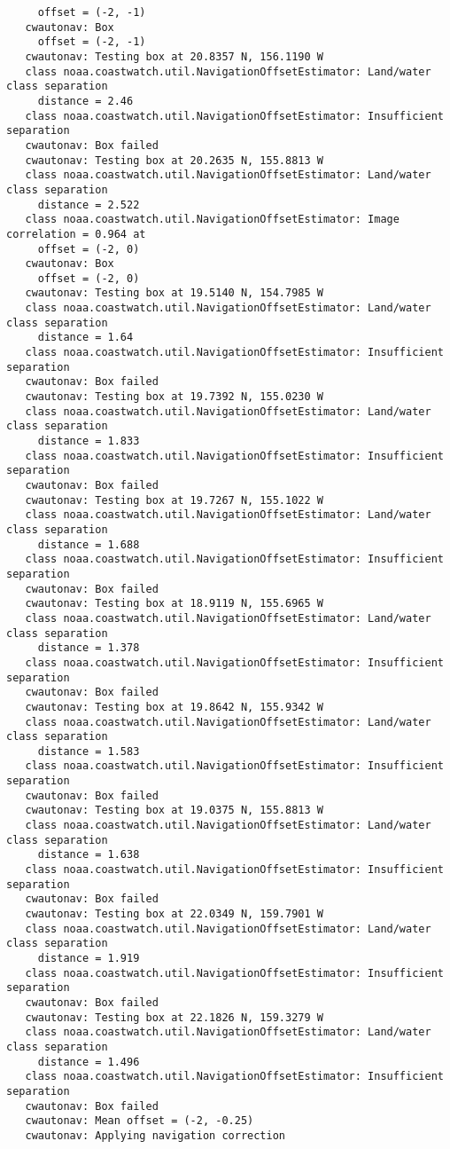 \begin{verbatim}
     offset = (-2, -1)
   cwautonav: Box 
     offset = (-2, -1)
   cwautonav: Testing box at 20.8357 N, 156.1190 W
   class noaa.coastwatch.util.NavigationOffsetEstimator: Land/water class separation 
     distance = 2.46
   class noaa.coastwatch.util.NavigationOffsetEstimator: Insufficient separation
   cwautonav: Box failed
   cwautonav: Testing box at 20.2635 N, 155.8813 W
   class noaa.coastwatch.util.NavigationOffsetEstimator: Land/water class separation 
     distance = 2.522
   class noaa.coastwatch.util.NavigationOffsetEstimator: Image correlation = 0.964 at 
     offset = (-2, 0)
   cwautonav: Box 
     offset = (-2, 0)
   cwautonav: Testing box at 19.5140 N, 154.7985 W
   class noaa.coastwatch.util.NavigationOffsetEstimator: Land/water class separation 
     distance = 1.64
   class noaa.coastwatch.util.NavigationOffsetEstimator: Insufficient separation
   cwautonav: Box failed
   cwautonav: Testing box at 19.7392 N, 155.0230 W
   class noaa.coastwatch.util.NavigationOffsetEstimator: Land/water class separation 
     distance = 1.833
   class noaa.coastwatch.util.NavigationOffsetEstimator: Insufficient separation
   cwautonav: Box failed
   cwautonav: Testing box at 19.7267 N, 155.1022 W
   class noaa.coastwatch.util.NavigationOffsetEstimator: Land/water class separation 
     distance = 1.688
   class noaa.coastwatch.util.NavigationOffsetEstimator: Insufficient separation
   cwautonav: Box failed
   cwautonav: Testing box at 18.9119 N, 155.6965 W
   class noaa.coastwatch.util.NavigationOffsetEstimator: Land/water class separation 
     distance = 1.378
   class noaa.coastwatch.util.NavigationOffsetEstimator: Insufficient separation
   cwautonav: Box failed
   cwautonav: Testing box at 19.8642 N, 155.9342 W
   class noaa.coastwatch.util.NavigationOffsetEstimator: Land/water class separation 
     distance = 1.583
   class noaa.coastwatch.util.NavigationOffsetEstimator: Insufficient separation
   cwautonav: Box failed
   cwautonav: Testing box at 19.0375 N, 155.8813 W
   class noaa.coastwatch.util.NavigationOffsetEstimator: Land/water class separation 
     distance = 1.638
   class noaa.coastwatch.util.NavigationOffsetEstimator: Insufficient separation
   cwautonav: Box failed
   cwautonav: Testing box at 22.0349 N, 159.7901 W
   class noaa.coastwatch.util.NavigationOffsetEstimator: Land/water class separation 
     distance = 1.919
   class noaa.coastwatch.util.NavigationOffsetEstimator: Insufficient separation
   cwautonav: Box failed
   cwautonav: Testing box at 22.1826 N, 159.3279 W
   class noaa.coastwatch.util.NavigationOffsetEstimator: Land/water class separation 
     distance = 1.496
   class noaa.coastwatch.util.NavigationOffsetEstimator: Insufficient separation
   cwautonav: Box failed
   cwautonav: Mean offset = (-2, -0.25)
   cwautonav: Applying navigation correction
 
\end{verbatim}

